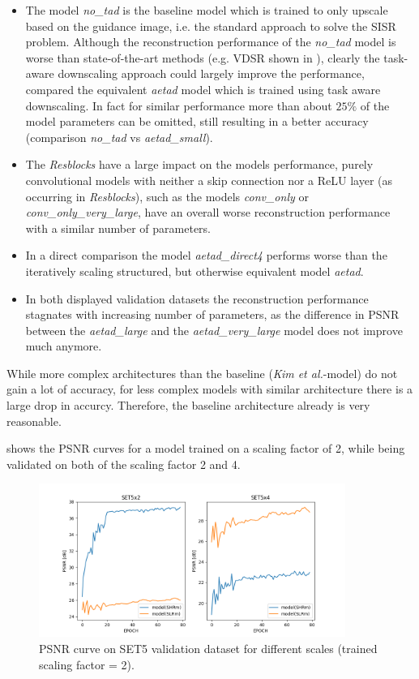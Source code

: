 \begin{itemize}
\item The model \textit{no\_tad} is the baseline model which is trained to
only upscale based on the guidance image, i.e. the standard approach to solve
the \ac{SISR} problem. Although the reconstruction performance of the
\textit{no\_tad} model is worse than state-of-the-art methods (e.g. VDSR
\cite{AISRUVDCN} shown in ), clearly the task-aware
downscaling approach could largely improve the performance, compared the equivalent
\textit{aetad} model which is trained using task aware downscaling. In fact
for similar performance more than about $25 \%$ of the model parameters can
be omitted, still resulting in a better accuracy (comparison \textit{no\_tad}
vs \textit{aetad\_small}).
\item The \textit{Resblocks} have a large impact on the models performance,
purely convolutional models with neither a skip connection nor a ReLU layer
(as occurring in \textit{Resblocks}), such as the models \textit{conv\_only} or
\textit{conv\_only\_very\_large}, have an overall worse reconstruction
performance with a similar number of parameters.
\item In a direct comparison the model \textit{aetad\_direct4} performs worse
than the iteratively scaling structured, but otherwise equivalent model
\textit{aetad}.
\item In both displayed validation datasets the reconstruction performance
stagnates with increasing number of parameters, as the difference in \ac{PSNR}
between the \textit{aetad\_large} and the \textit{aetad\_very\_large}
model does not improve much anymore.
\end{itemize}

While more complex architectures than the baseline (\textit{Kim et al.}-model)
do not gain a lot of accuracy, for less complex models with similar architecture
there is a large drop in accurcy. Therefore, the baseline architecture already
is very reasonable.

 shows the \ac{PSNR} curves for a model
trained on a scaling factor of 2, while being validated on both of the scaling
factor 2 and 4.

\begin{figure}[!htbp]
	\centering
	\includegraphics[width=10cm]{figures/sisr_different_scales}
	\caption{\ac{PSNR} curve on SET5 validation dataset for different scales
	(trained scaling factor = 2).}
  \label{fig:sisr_different_scales}
\end{figure}


